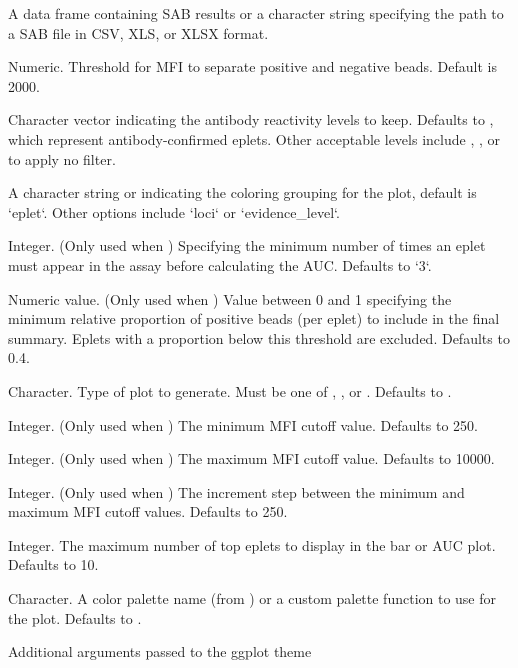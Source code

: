 \documentclass[letterpaper]{book}
\begin{document}
\begin{Arguments}
\begin{ldescription}
\item[\code{result\_file}] A data frame containing SAB results or a character string specifying
the path to a SAB file in CSV, XLS, or XLSX format.

\item[\code{cutoff}] Numeric. Threshold for MFI to separate positive and negative beads.
Default is 2000.

\item[\code{evidence\_level}] Character vector indicating the antibody reactivity levels to keep.
Defaults to , which represent antibody-confirmed eplets.
Other acceptable levels include , , or  to apply no filter.

\item[\code{group\_by}] A character string or indicating the coloring grouping for
the plot, default is `eplet`. Other options include `loci` or
`evidence\_level`.

\item[\code{eplet\_filter}] Integer. (Only used when )
Specifying the minimum number of times an eplet must appear in the assay
before calculating the AUC. Defaults to `3`.

\item[\code{percPos\_filter}] Numeric value. (Only used when )
Value between 0 and 1 specifying the minimum relative proportion of
positive beads (per eplet) to include in the final summary. Eplets with a
proportion below this threshold are excluded. Defaults to 0.4.

\item[\code{plot\_type}] Character. Type of plot to generate. Must be one of ,
, or . Defaults to .

\item[\code{cut\_min}] Integer. (Only used when ) The minimum MFI cutoff value.
Defaults to 250.

\item[\code{cut\_max}] Integer. (Only used when ) The maximum MFI cutoff value.
Defaults to 10000.

\item[\code{cut\_step}] Integer. (Only used when ) The increment step between
the minimum and maximum MFI cutoff values. Defaults to 250.

\item[\code{top\_eplets}] Integer. The maximum number of top eplets to display in the bar or AUC plot.
Defaults to 10.

\item[\code{palette}] Character. A color palette name (from ) or a custom
palette function to use for the plot. Defaults to .

\item[\code{...}] Additional arguments passed to the ggplot theme
\end{ldescription}
\end{Arguments}
\end{document}
